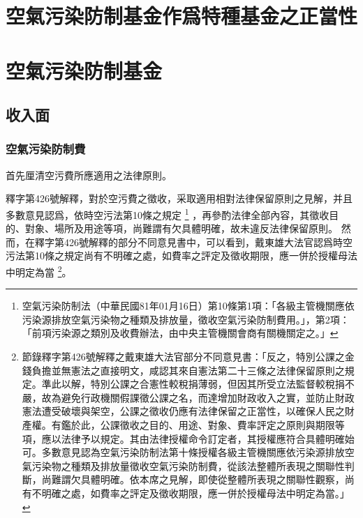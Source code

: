 \documentclass[12pt,a4paper]{article}
\begin{document}


\section{空氣污染防制基金作爲特種基金之正當性}


\section{空氣污染防制基金}
\subsection{收入面}

\subsubsection{空氣污染防制費}

首先厘清空污費所應適用之法律原則。


釋字第426號解釋，對於空污費之徵收，采取適用相對法律保留原則之見解，并且多數意見認爲，依時空污法第10條之規定
\footnote{空氣污染防制法（中華民國81年01月16日）第10條第1項：「各級主管機關應依污染源排放空氣污染物之種類及排放量，徵收空氣污染防制費用。」，第2項：「前項污染源之類別及收費辦法，由中央主管機關會商有關機關定之。」}
，再參酌法律全部內容，其徵收目的、對象、場所及用途等項，尚難謂有欠具體明確，故未違反法律保留原則。
然而，在釋字第426號解釋的部分不同意見書中，可以看到，戴東雄大法官認爲時空污法第10條之規定尚有不明確之處，如費率之評定及徵收期限，應一併於授權母法中明定為當
\footnote{節錄釋字第426號解釋之戴東雄大法官部分不同意見書：「反之，特別公課之金錢負擔並無憲法之直接明文，咸認其來自憲法第二十三條之法律保留原則之規定。準此以解，特別公課之合憲性較稅捐薄弱，但因其所受立法監督較稅捐不嚴，故為避免行政機關假課徵公課之名，而達增加財政收入之實，並防止財政憲法遭受破壞與架空，公課之徵收仍應有法律保留之正當性，以確保人民之財產權。有鑑於此，公課徵收之目的、用途、對象、費率評定之原則與期限等項，應以法律予以規定。其由法律授權命令訂定者，其授權應符合具體明確始可。多數意見認為空氣污染防制法第十條授權各級主管機關應依污染源排放空氣污染物之種類及排放量徵收空氣污染防制費，從該法整體所表現之關聯性判斷，尚難謂欠具體明確。依本席之見解，即使從整體所表現之關聯性觀察，尚有不明確之處，如費率之評定及徵收期限，應一併於授權母法中明定為當。」}。
\end{document}
